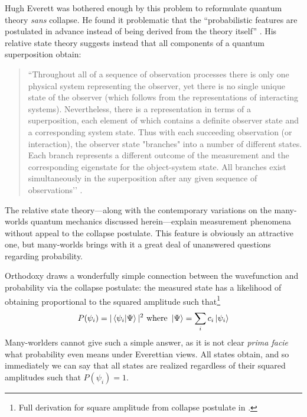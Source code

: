 \documentclass{article}
\begin{document}
Hugh Everett was bothered enough by this problem to reformulate quantum theory \emph{sans} collapse. He found it problematic that the “probabilistic features are postulated in advance instead of being derived from the theory itself” \parencite[462]{everettRelativeStateFormulation1957}. His relative state theory suggests instead that all components of a quantum superposition obtain:
\begin{quote}
  ``Throughout all of a sequence of observation processes there is only one physical system representing the observer, yet there is no single unique state of the observer (which follows from the representations of interacting systems). Nevertheless, there is a representation in terms of a superposition, each element of which contains a definite observer state and a corresponding system state. Thus with each succeeding observation (or interaction), the observer state "branches" into a number of different states. Each branch represents a different outcome of the measurement and the corresponding eigenstate for the object-system state. All branches exist simultaneously in the superposition after any given sequence of observations’’ \parencite[459]{everettRelativeStateFormulation1957}.
\end{quote}

The relative state theory—along with the contemporary variations on the many-worlds quantum mechanics discussed herein—explain measurement phenomena without appeal to the collapse postulate. This feature is obviously an attractive one, but many-worlds brings with it a great deal of unanswered questions regarding probability.

Orthodoxy draws a wonderfully simple connection between the wavefunction and probability via the collapse postulate: the measured state has a likelihood of obtaining proportional to the squared amplitude such that\footnote{Full derivation for square amplitude from collapse postulate in \cite{sakuraiModernQuantumMechanics2017}.}
\begin{gather}
  P(\psi_i) = |\braket{\psi_i | \Psi}|^2 \text{ where } \ket{\Psi} = \sum_i c_i \ket{\psi_i}
\end{gather}
Many-worlders cannot give such a simple answer, as it is not clear \emph{prima facie} what probability even means under Everettian views. All states obtain, and so immediately we can say that all states are realized regardless of their squared amplitudes such that $P(\psi_i)=1$.
\end{document}
